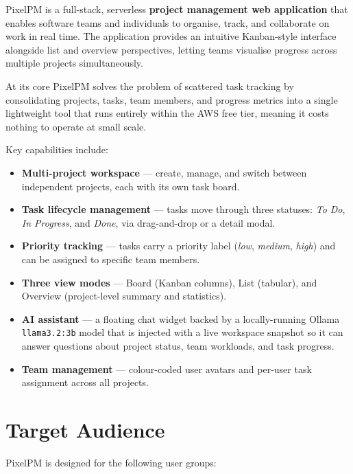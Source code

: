 \documentclass[12pt,a4paper]{report}
\begin{document}
PixelPM is a full-stack, serverless \textbf{project management web application} that enables
software teams and individuals to organise, track, and collaborate on work in real time.
The application provides an intuitive Kanban-style interface alongside list and overview
perspectives, letting teams visualise progress across multiple projects simultaneously.

At its core PixelPM solves the problem of scattered task tracking by consolidating
projects, tasks, team members, and progress metrics into a single lightweight tool that
runs entirely within the AWS free tier, meaning it costs nothing to operate at small scale.

Key capabilities include:

\begin{itemize}[leftmargin=2em]
  \item \textbf{Multi-project workspace} — create, manage, and switch between independent
        projects, each with its own task board.
  \item \textbf{Task lifecycle management} — tasks move through three statuses:
        \emph{To Do}, \emph{In Progress}, and \emph{Done}, via drag-and-drop or a detail modal.
  \item \textbf{Priority tracking} — tasks carry a priority label (\emph{low}, \emph{medium},
        \emph{high}) and can be assigned to specific team members.
  \item \textbf{Three view modes} — Board (Kanban columns), List (tabular), and Overview
        (project-level summary and statistics).
  \item \textbf{AI assistant} — a floating chat widget backed by a locally-running Ollama
        \texttt{llama3.2:3b} model that is injected with a live workspace snapshot so it can
        answer questions about project status, team workloads, and task progress.
  \item \textbf{Team management} — colour-coded user avatars and per-user task assignment
        across all projects.
\end{itemize}

\section{Target Audience}

PixelPM is designed for the following user groups:
\end{document}
